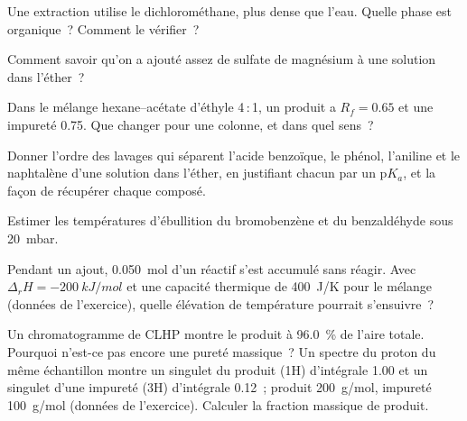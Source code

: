 \begin{exercise}[$\star$]\label{exo:b2:lab-techniques-2:2}
Une extraction utilise le dichlorométhane, plus dense que l'eau. Quelle phase est organique~? Comment le vérifier~?
\end{exercise}

\begin{exercise}[$\star$]\label{exo:b2:lab-techniques-2:3}
Comment savoir qu'on a ajouté assez de sulfate de magnésium à une solution dans l'éther~?
\end{exercise}

\begin{exercise}[$\star$]\label{exo:b2:lab-techniques-2:4}
Dans le mélange hexane--acétate d'éthyle 4\,:\,1, un produit a $R_f = 0.65$ et une impureté 0.75. Que
changer pour une colonne, et dans quel sens~?
\end{exercise}

\begin{exercise}[$\star\star$]\label{exo:b2:lab-techniques-2:5}
Donner l'ordre des lavages qui séparent l'acide benzoïque, le phénol, l'aniline et le naphtalène d'une
solution dans l'éther, en justifiant chacun par un $\mathrm pK_a$, et la façon de récupérer chaque composé.
\end{exercise}

\begin{exercise}[$\star\star$]\label{exo:b2:lab-techniques-2:6}
Estimer les températures d'ébullition du bromobenzène et du benzaldéhyde sous \qty{20}{mbar}.
\end{exercise}

\begin{exercise}[$\star\star$]\label{exo:b2:lab-techniques-2:7}
Pendant un ajout, \qty{0.050}{mol} d'un réactif s'est accumulé sans réagir. Avec $\Delta_rH =
\qty{-200}{kJ/mol}$ et une capacité thermique de \qty{400}{J/K} pour le mélange (données de l'exercice),
quelle élévation de température pourrait s'ensuivre~?
\end{exercise}

\begin{exercise}[$\star\star$]\label{exo:b2:lab-techniques-2:8}
Un chromatogramme de CLHP montre le produit à 96.0~\% de l'aire totale. Pourquoi n'est-ce pas encore une
pureté massique~? Un spectre du proton du même échantillon montre un singulet du produit (1H)
d'intégrale 1.00 et un singulet d'une impureté (3H) d'intégrale 0.12~; produit \qty{200}{g/mol},
impureté \qty{100}{g/mol} (données de l'exercice). Calculer la fraction massique de produit.
\end{exercise}

